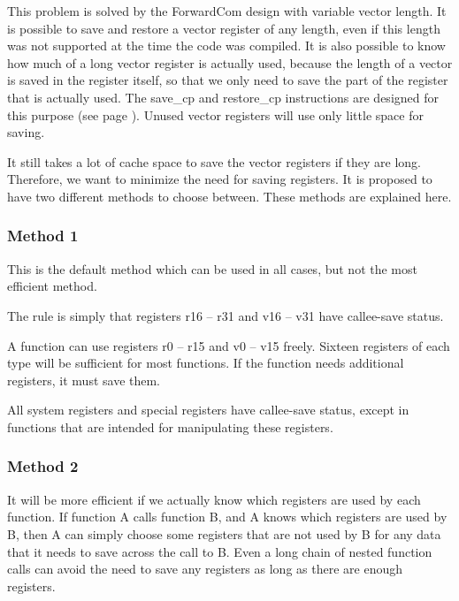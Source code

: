 \documentclass[forwardcom.tex]{subfiles}
\begin{document}
This problem is solved by the ForwardCom design with variable vector length. It is possible to save and restore a vector register of any length, even if this length was not supported at the time the code was compiled. It is also possible to know how much of a long vector register is actually used, because the length of a vector is saved in the register itself, so that we only need to save the part of the register that is actually used. The save\_cp and restore\_cp instructions are designed for this purpose (see page \pageref{table:saveCpInstruction}). Unused vector registers will use only little space for saving. 
\vspace{2mm}

It still takes a lot of cache space to save the vector registers if they are long. Therefore, we want to minimize the need for saving registers. It is proposed to have two different methods to choose between. These methods are explained here. 

\subsubsection{Method 1}
This is the default method which can be used in all cases, but not the most efficient method. 
\vspace{2mm}

The rule is simply that registers r16 – r31 and v16 – v31 have callee-save status.
\vspace{2mm}

A function can use registers r0 – r15 and v0 – v15 freely. Sixteen registers of each type will be sufficient for most functions. If the function needs additional registers, it must save them. 
\vspace{2mm}

All system registers and special registers have callee-save status, except in functions that are intended for manipulating these registers.

\subsubsection{Method 2}
It will be more efficient if we actually know which registers are used by each function. If function A calls function B, and A knows which registers are used by B, then A can simply choose some registers that are not used by B for any data that it needs to save across the call to B. Even a long chain of nested function calls can avoid the need to save any registers as long as there are enough registers. 
\vspace{2mm}
\end{document}
